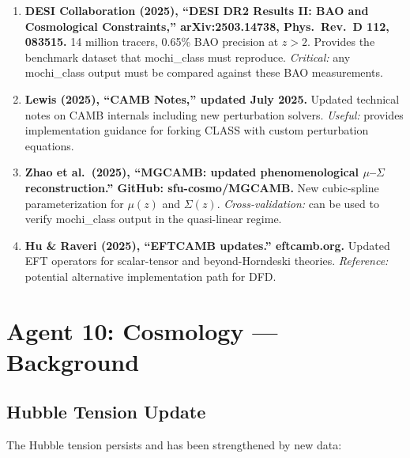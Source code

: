 \documentclass[11pt]{article}
\begin{document}
\begin{tcolorbox}[colback=green!5!white, colframe=green!50!black,
  title=\textbf{Agent 9: NEW LITERATURE REVIEWED}]

\begin{enumerate}

\item \textbf{DESI Collaboration (2025), ``DESI DR2 Results II:
  BAO and Cosmological Constraints,'' arXiv:2503.14738, Phys.\ Rev.\ D
  112, 083515.}
  14 million tracers, 0.65\% BAO precision at $z > 2$. Provides
  the benchmark dataset that mochi\_class must reproduce.
  \emph{Critical:} any mochi\_class output must be compared against
  these BAO measurements.

\item \textbf{Lewis (2025), ``CAMB Notes,'' updated July 2025.}
  Updated technical notes on CAMB internals including new perturbation
  solvers. \emph{Useful:} provides implementation guidance for
  forking CLASS with custom perturbation equations.

\item \textbf{Zhao et al.\ (2025), ``MGCAMB: updated phenomenological
  $\mu$--$\Sigma$ reconstruction.'' GitHub: sfu-cosmo/MGCAMB.}
  New cubic-spline parameterization for $\mu(z)$ and $\Sigma(z)$.
  \emph{Cross-validation:} can be used to verify mochi\_class output
  in the quasi-linear regime.

\item \textbf{Hu \& Raveri (2025), ``EFTCAMB updates.'' eftcamb.org.}
  Updated EFT operators for scalar-tensor and beyond-Horndeski theories.
  \emph{Reference:} potential alternative implementation path for DFD.

\end{enumerate}
\end{tcolorbox}

\section{Agent 10: Cosmology --- Background}

\subsection{Hubble Tension Update}

The Hubble tension persists and has been strengthened by new data:
\end{document}
